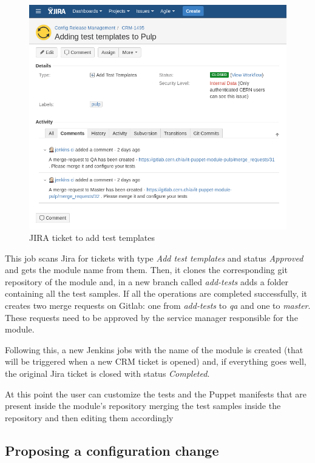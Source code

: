 \begin{figure}[H]
\includegraphics[width=\textwidth,height=\textheight,keepaspectratio]{ContinuousIntegrationWithJenkins/images/add_test_templates.jpg}
\caption{JIRA ticket to add test templates}
\end{figure}

This job scans Jira for tickets with type \textit{Add test templates} and
status \textit{Approved} and gets the module name from them. Then, it
clones the corresponding git repository of the module and, in a new branch
called \textit{add-tests} adds a folder containing all the test samples.
If all the operations are completed successfully, it creates two merge
requests on Gitlab: one from \textit{add-tests} to \textit{qa} and one to
\textit{master}. These requests need to be approved by the service manager
responsible for the module.

Following this, a new Jenkins jobs with the name of the module is created
(that will be triggered when a new CRM ticket is opened) and, if
everything goes well, the original Jira ticket is closed with status
\textit{Completed}. 

At this point the user can customize the tests and the Puppet manifests
that are present inside the module's repository merging the test samples
inside the repository and then editing them accordingly 

\subsection{Proposing a configuration change}

